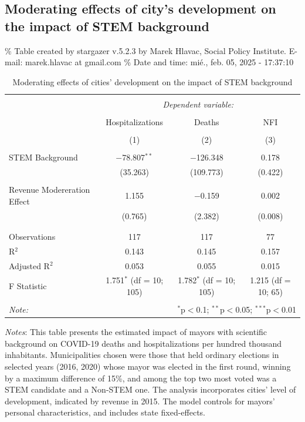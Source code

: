 \documentclass[
  letterpaper,
  DIV=11,
  numbers=noendperiod]{scrartcl}
\begin{document}
\subsection{Moderating effects of city's development on the impact of
STEM
background}\label{moderating-effects-of-citys-development-on-the-impact-of-stem-background}

\% Table created by stargazer v.5.2.3 by Marek Hlavac, Social Policy
Institute. E-mail: marek.hlavac at gmail.com \% Date and time: mié.,
feb. 05, 2025 - 17:37:10

\begin{table}[!htbp] \centering 
  \caption{Moderating effects of cities’ development on the impact of STEM background} 
  \label{} 
\begin{tabular}{@{\extracolsep{5pt}}lccc} 
\\[-1.8ex]\hline 
\hline \\[-1.8ex] 
 & \multicolumn{3}{c}{\textit{Dependent variable:}} \\ 
\cline{2-4} 
\\[-1.8ex] & Hospitalizations & Deaths & NFI \\ 
\\[-1.8ex] & (1) & (2) & (3)\\ 
\hline \\[-1.8ex] 
 STEM Background & $-$78.807$^{**}$ & $-$126.348 & 0.178 \\ 
  & (35.263) & (109.773) & (0.422) \\ 
  & & & \\ 
 Revenue Modereration Effect & 1.155 & $-$0.159 & 0.002 \\ 
  & (0.765) & (2.382) & (0.008) \\ 
  & & & \\ 
\hline \\[-1.8ex] 
Observations & 117 & 117 & 77 \\ 
R$^{2}$ & 0.143 & 0.145 & 0.157 \\ 
Adjusted R$^{2}$ & 0.053 & 0.055 & 0.015 \\ 
F Statistic & 1.751$^{*}$ (df = 10; 105) & 1.782$^{*}$ (df = 10; 105) & 1.215 (df = 10; 65) \\ 
\hline 
\hline \\[-1.8ex] 
\textit{Note:}  & \multicolumn{3}{r}{$^{*}$p$<$0.1; $^{**}$p$<$0.05; $^{***}$p$<$0.01} \\ 
\end{tabular} 
\end{table}

\emph{Notes}: This table presents the estimated impact of mayors with
scientific background on COVID-19 deaths and hospitalizations per
hundred thousand inhabitants. Municipalities chosen were those that held
ordinary elections in selected years (2016, 2020) whose mayor was
elected in the first round, winning by a maximum difference of 15\%, and
among the top two most voted was a STEM candidate and a Non-STEM one.
The analysis incorporates cities' level of development, indicated by
revenue in 2015. The model controls for mayors' personal
characteristics, and includes state fixed-effects.
\end{document}
